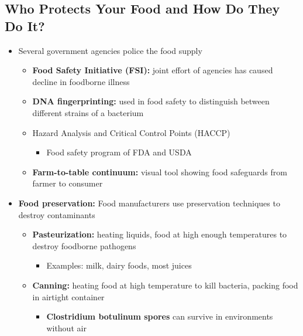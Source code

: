 \documentclass[12pt]{article}
\begin{document}
        \subsection{Who Protects Your Food and How Do They Do It?}
            \begin{itemize}
                \item Several government agencies police the food supply
                    \begin{itemize}
                        \item \textbf{Food Safety Initiative (FSI):} joint effort of agencies has caused decline in foodborne illness
                        \item \textbf{DNA fingerprinting:} used in food safety to distinguish between different strains of a bacterium
                        \item Hazard Analysis and Critical Control Points (HACCP)
                            \begin{itemize}
                                \item Food safety program of FDA and USDA
                            \end{itemize}
                        \item \textbf{Farm-to-table continuum:} visual tool showing food safeguards from farmer to consumer
                    \end{itemize}
                \item \textbf{Food preservation:} Food manufacturers use preservation techniques to destroy contaminants
                    \begin{itemize}
                        \item \textbf{Pasteurization:} heating liquids, food at high enough temperatures to destroy foodborne pathogens
                            \begin{itemize}
                                \item Examples: milk, dairy foods, most juices
                            \end{itemize}
                        \item \textbf{Canning:} heating food at high temperature to kill bacteria, packing food in airtight container
                            \begin{itemize}
                                \item \textbf{Clostridium botulinum spores} can survive in environments without air
                                    \begin{itemize}

\end{itemize}
\end{itemize}
\end{itemize}
\end{itemize}
\end{document}
